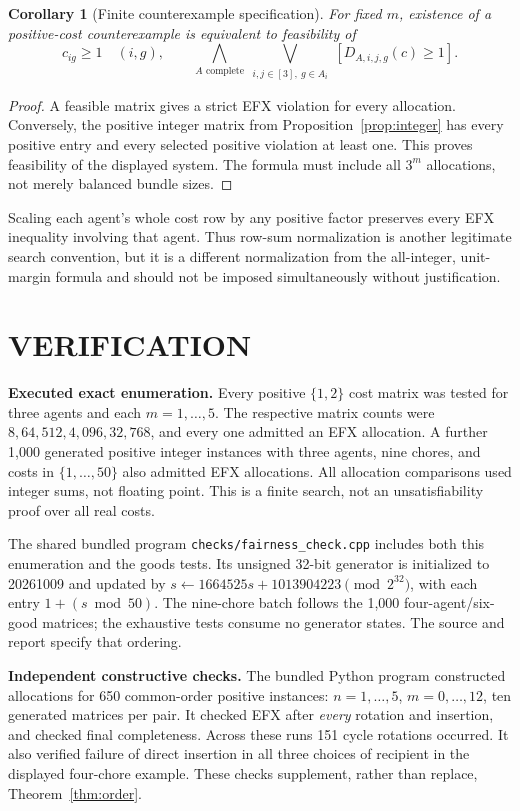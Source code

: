 \documentclass[11pt,a4paper]{article}
\newtheorem{corollary}[theorem]{Corollary}
\theoremstyle{definition}\newtheorem{definition}[theorem]{Definition}
\theoremstyle{remark}\newtheorem{remark}[theorem]{Remark}
\newcommand{\1}{\mathbf 1}
\begin{document}
\begin{corollary}[Finite counterexample specification]
For fixed $m$, existence of a positive-cost counterexample is equivalent to feasibility of
\[
 c_{ig}\ge1\quad(i,g),\qquad
 \bigwedge_{A\text{ complete}}
 \bigvee_{\substack{i,j\in[3],\ g\in A_i}}
 [D_{A,i,j,g}(c)\ge1].
\]
\end{corollary}
\begin{proof}
A feasible matrix gives a strict EFX violation for every allocation. Conversely, the positive integer matrix from Proposition~\ref{prop:integer} has every positive entry and every selected positive violation at least one. This proves feasibility of the displayed system. The formula must include all $3^m$ allocations, not merely balanced bundle sizes.
\end{proof}
Scaling each agent's whole cost row by any positive factor preserves every EFX inequality involving that agent. Thus row-sum normalization is another legitimate search convention, but it is a different normalization from the all-integer, unit-margin formula and should not be imposed simultaneously without justification.

\section{VERIFICATION}
\textbf{Executed exact enumeration.} Every positive $\{1,2\}$ cost matrix was tested for three agents and each $m=1,\ldots,5$. The respective matrix counts were $8,64,512,4,096,32,768$, and every one admitted an EFX allocation. A further 1,000 generated positive integer instances with three agents, nine chores, and costs in $\{1,\ldots,50\}$ also admitted EFX allocations. All allocation comparisons used integer sums, not floating point. This is a finite search, not an unsatisfiability proof over all real costs.

The shared bundled program \texttt{checks/fairness\_check.cpp} includes both this enumeration and the goods tests. Its unsigned 32-bit generator is initialized to 20261009 and updated by $s\leftarrow1664525s+1013904223\pmod{2^{32}}$, with each entry $1+(s\bmod50)$. The nine-chore batch follows the 1,000 four-agent/six-good matrices; the exhaustive tests consume no generator states. The source and report specify that ordering.

\textbf{Independent constructive checks.} The bundled Python program  constructed allocations for 650 common-order positive instances: $n=1,\ldots,5$, $m=0,\ldots,12$, ten generated matrices per pair. It checked EFX after \emph{every} rotation and insertion, and checked final completeness. Across these runs 151 cycle rotations occurred. It also verified failure of direct insertion in all three choices of recipient in the displayed four-chore example. These checks supplement, rather than replace, Theorem~\ref{thm:order}.
\end{document}

